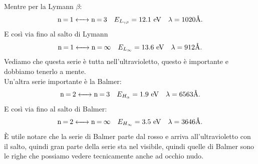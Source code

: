 Mentre per la Lymann $\beta $:
\begin{align}
	&\ce{n = 1 <-> n = 3 }  & E_{L_{\gamma \beta  }} = 12.1 \text{ eV}& &\lambda = 1020 \text{\AA}
.\end{align}
E così via fino al salto di Lymann
\begin{align}
	&\ce{n = 1 <-> n = \infty }  & E_{L_{\infty}} = 13.6 \text{ eV}& &\lambda = 912 \text{\AA}
.\end{align}
Vediamo che questa serie è tutta nell'ultravioletto, questo è importante e dobbiamo tenerlo a mente.\\
Un'altra serie importante è la Balmer:
\begin{align}
	&\ce{n = 2 <-> n = 3 }  & E_{H_{\alpha }} = 1.9 \text{ eV}& &\lambda = 6563 \text{\AA}
.\end{align}
E così via fino al salto di Balmer:
\begin{align}
	&\ce{n = 2 <-> n = \infty }  & E_{H_{\infty }} = 3.5 \text{ eV}& &\lambda = 3646 \text{\AA}
.\end{align}
È utile notare che la serie di Balmer parte dal rosso e arriva all'ultravioletto con il salto, quindi gran parte della serie sta nel visibile, quindi quelle di Balmer sono le righe che possiamo vedere tecnicamente anche ad occhio nudo.
